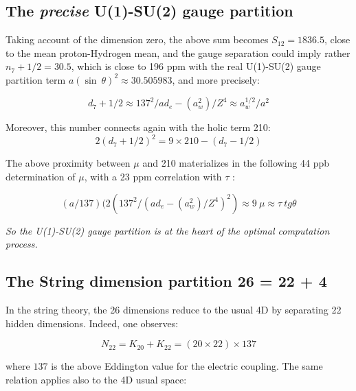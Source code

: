 \documentclass[a4paper,9pt]{article}
\begin{document}


 \subsection{The \textit{precise} U(1)-SU(2) gauge partition}
 Taking account of the dimension zero, the above sum becomes $S_{12} = 1836.5$, close to the mean proton-Hydrogen mean, and the gauge separation could imply rather $n_7+1/2 = 30.5$, which is close to 196 ppm with the real U(1)-SU(2) gauge partition term $a (\sin~\theta)^2\approx 30.505983$, and more precisely:
 
 \begin{equation}\label{Eq39}
 d_7+1/2 \approx 137^2/ad_e -(a_w^2)/Z^4 \approx a_w^{1/2}/a^2
 \end{equation}
 
Moreover, this number connects again with the holic term 210:
% 
 \begin{equation}\label{Eq40}
 2(d_7+1/2)^2 = 9\times210 - (d_7-1/2)
 \end{equation}
 
 The above proximity between $\mu$ and 210 materializes in the following 44 ppb determination of $\mu$, with a 23 ppm correlation with $\tau$ : 
 
 \begin{equation}\label{Eq41}
 (a/137)(2(137^2/(ad_e -(a_w^2)/Z^4)^2) \approx 9~\mu \approx \tau~ tg \theta
 \end{equation}
 
 \textit{So the U(1)-SU(2) gauge partition is at the heart of the optimal computation process.}
 
 \subsection{The String dimension partition 26 = 22 + 4}
In the string theory, the 26 dimensions reduce to the usual 4D by separating 22 hidden dimensions. Indeed, one observes:

\begin{equation}\label{Eq42}
 N_{22}  = K_{20} + K_{22} = (20\times 22) \times 137
 \end{equation}

where $137$ is the above Eddington value for the electric coupling. The same relation applies also to the 4D usual space:
\end{document}
